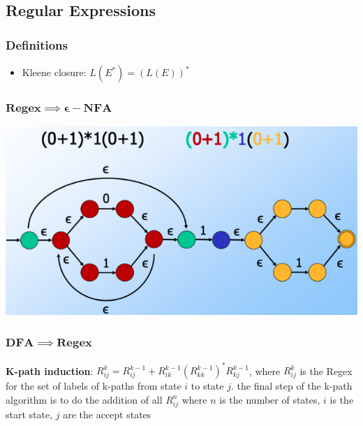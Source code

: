 \subsection{\color{ForestGreen}Regular Expressions}
\subsubsection{Definitions}
\begin{itemize}
    \item Kleene closure: $L(E^*) = (L(E))^*$
\end{itemize}
\subsubsection{$\mathbf{Regex \implies \epsilon-NFA}$}
\begin{Figure}
    \includegraphics[width=0.7\linewidth]{figures/RE-NFA.png}
\end{Figure}
\subsubsection{$\mathbf{DFA \implies Regex}$}
\textbf{K-path induction}: $R_{ij}^ k = R_{ij}^{k-1} + R_{ik}^{k-1}(R_{kk}^{k-1})^* R_{kj} ^{k-1} $, where $R^k_{ij}$ is the Regex for the set of labels of k-paths from state $i$ to state $j.$
the final step of the k-path algorithm is to do the addition of all $R_{ij}^n$ where $n$ is the number of states, $i$ is the start state, $j$ are the accept states
